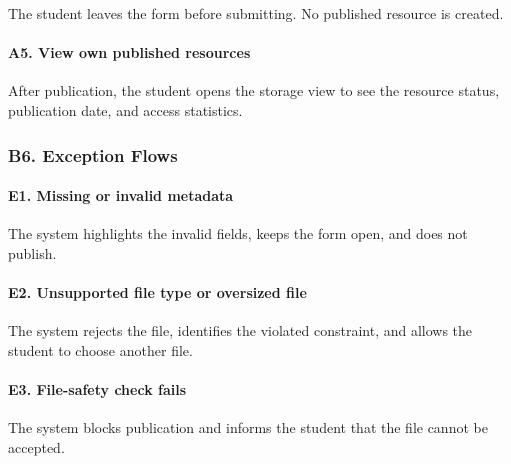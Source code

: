 \documentclass[12pt]{article}
\begin{document}
The student leaves the form before submitting. No published resource is created.
\par\medskip

\hypertarget{sec:a5-view-own-published-resources}{}
\paragraph*{A5. View own published resources}
\par\medskip

After publication, the student opens the storage view to see the resource status, publication date, and access statistics.
\par\medskip

\hypertarget{sec:b6-exception-flows}{}
\subsubsection*{B6. Exception Flows}
\par\medskip

\hypertarget{sec:e1-missing-or-invalid-metadata}{}
\paragraph*{E1. Missing or invalid metadata}
\par\medskip

The system highlights the invalid fields, keeps the form open, and does not publish.
\par\medskip

\hypertarget{sec:e2-unsupported-file-type-or-oversized-file}{}
\paragraph*{E2. Unsupported file type or oversized file}
\par\medskip

The system rejects the file, identifies the violated constraint, and allows the student to choose another file.
\par\medskip

\hypertarget{sec:e3-file-safety-check-fails}{}
\paragraph*{E3. File-safety check fails}
\par\medskip

The system blocks publication and informs the student that the file cannot be accepted.
\par\medskip
\end{document}
